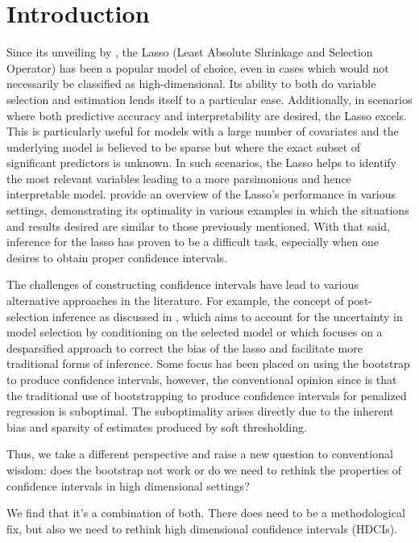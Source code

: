\section{Introduction}

Since its unveiling by \cite{Tibshirani1996}, the Lasso (Least Absolute Shrinkage and Selection Operator) has been a popular model of choice, even in cases which would not necessarily be classified as high-dimensional. Its ability to both do variable selection and estimation lends itself to a particular ease. Additionally, in scenarios where both predictive accuracy and interpretability are desired, the Lasso excels. This is particularly useful for models with a large number of covariates and the underlying model is believed to be sparse but where the exact subset of significant predictors is unknown. In such scenarios, the Lasso helps to identify the most relevant variables leading to a more parsimonious and hence interpretable model. \cite{HTF2009} provide an overview of the Lasso's performance in various settings, demonstrating its optimality in various examples in which the situations and results desired are similar to those previously mentioned. With that said, inference for the lasso has proven to be a difficult task, especially when one desires to obtain proper confidence intervals.

The challenges of constructing confidence intervals have lead to various alternative approaches in the literature. For example, the concept of post-selection inference as discussed in \cite{LeeEtAl2016}, which aims to account for the uncertainty in model selection by conditioning on the selected model or \cite{ZhangZhang2014} which focuses on a desparsified approach to correct the bias of the lasso and facilitate more traditional forms of inference. Some focus has been placed on using the bootstrap to produce confidence intervals, however, the conventional opinion since \cite{Chatterjee2010} is that the traditional use of bootstrapping to produce confidence intervals for penalized regression is suboptimal. The suboptimality arises directly due to the inherent bias and sparsity of estimates produced by soft thresholding.

Thus, we take a different perspective and raise a new question to conventional wisdom: does the bootstrap not work or do we need to rethink the properties of confidence intervals in high dimensional settings?

We find that it's a combination of both. There does need to be a methodological fix, but also we need to rethink high dimensional confidence intervals (HDCIs).


